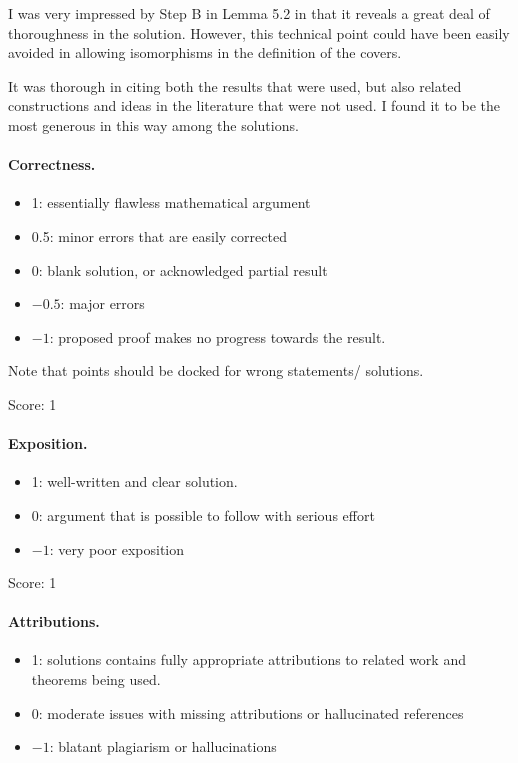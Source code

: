 \documentclass[11pt]{article}
\theoremstyle{definition}
\theoremstyle{remark}
\begin{document}
I was very impressed by Step B in Lemma 5.2 in that it reveals a great deal of thoroughness in the solution. However, this technical point could have been easily avoided in allowing isomorphisms in the definition of the covers. 


It was thorough in citing both the results that were used, but also related constructions and ideas in the literature that were not used. I found it to be the most generous in this way among the solutions. 


\paragraph{Correctness.}
\begin{itemize}
	\item  1: essentially flawless mathematical argument
	\item  0.5: minor errors that are easily corrected
	\item  0: blank solution, or acknowledged partial result
	\item  $-0.5$: major errors
	\item  $-1$: proposed proof makes no progress towards the result.
\end{itemize}
Note that points should be docked for wrong statements/ solutions.


\noindent Score: 1

\paragraph{Exposition.}
\begin{itemize}
	\item  1: well-written and clear solution.
	\item  0: argument that is possible to follow with serious effort
	\item  $-1$: very poor exposition
\end{itemize}


\noindent Score: 1

\paragraph{Attributions.}
\begin{itemize}
	\item  1: solutions contains fully appropriate attributions
		to related work and theorems being used.
	\item  0: moderate issues with missing attributions or hallucinated references
	\item  $-1$: blatant plagiarism or hallucinations
\end{itemize}
\end{document}
